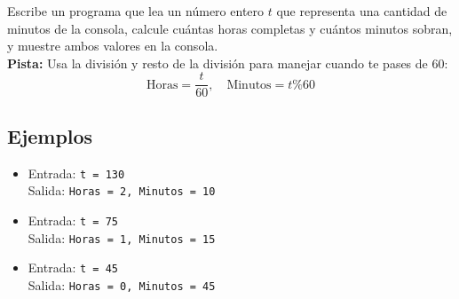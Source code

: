 Escribe un programa que lea un número entero \(t\) que representa una cantidad de minutos de la consola, calcule cuántas horas completas y cuántos minutos sobran, y muestre ambos valores en la consola.\\
\textbf{Pista:} Usa la división y resto de la división para manejar cuando te pases de 60:
\[
\text{Horas} = \frac{t}{60}, \quad \text{Minutos} = t \% 60
\]
\subsection*{Ejemplos}
\begin{itemize}
\item Entrada: \texttt{t = 130}\\
      Salida: \texttt{Horas = 2, Minutos = 10}
\item Entrada: \texttt{t = 75}\\
      Salida: \texttt{Horas = 1, Minutos = 15}
\item Entrada: \texttt{t = 45}\\
      Salida: \texttt{Horas = 0, Minutos = 45}
\end{itemize}
